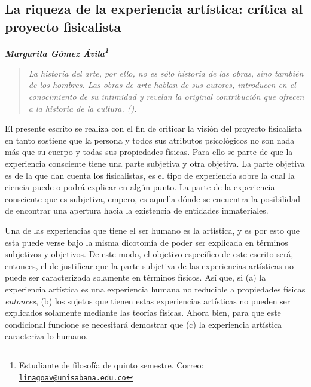\documentclass[]{book}
\newcommand{\autor}[1]{            %
  \begin{center}                   %
    \vspace*{-3.5em}               %
    \textbf{\textit{\large #1}}    %
    \vspace*{+4em}                 %
  \end{center}
}
\begin{document}
\begin{refsection}
\chapter{\texorpdfstring{\textbf{La riqueza de la experiencia artística:
crítica al proyecto
fisicalista}}{La riqueza de la experiencia artística: crítica al proyecto fisicalista}}\label{la-riqueza-de-la-experiencia-artuxedstica-cruxedtica-al-proyecto-fisicalista}

\autor{Margarita Gómez Ávila\footnote{Estudiante de filosofía de
  quinto semestre. Correo:
  \href{mailto:linagoav@unisabana.edu.co}{\nolinkurl{linagoav@unisabana.edu.co}}}}

\begin{quote}
\emph{La historia del arte, por ello, no es sólo historia de las obras,
sino también de los hombres. Las obras de arte hablan de sus autores,
introducen en el conocimiento de su intimidad y revelan la original
    contribución que ofrecen a la historia de la cultura. (\cite{Juan1999}).}
\end{quote}

El presente escrito se realiza con el fin de criticar la visión del
proyecto fisicalista en tanto sostiene que la persona y todos sus
atributos psicológicos no son nada más que su cuerpo y todas sus
propiedades físicas. Para ello se parte de que la experiencia consciente
tiene una parte subjetiva y otra objetiva. La parte objetiva es de la
que dan cuenta los fisicalistas, es el tipo de experiencia sobre la cual
la ciencia puede o podrá explicar en algún punto. La parte de la
experiencia consciente que es subjetiva, empero, es aquella dónde se
encuentra la posibilidad de encontrar una apertura hacia la existencia
de entidades inmateriales.

Una de las experiencias que tiene el ser humano es la artística, y es
por esto que esta puede verse bajo la misma dicotomía de poder ser
explicada en términos subjetivos y objetivos. De este modo, el objetivo
específico de este escrito será, entonces, el de justificar que la parte
subjetiva de las experiencias artísticas no puede ser caracterizada
solamente en términos físicos. Así que, si (a) la experiencia artística
es una experiencia humana no reducible a propiedades físicas
\emph{entonces}, (b) los sujetos que tienen estas experiencias
artísticas no pueden ser explicados solamente mediante las teorías
físicas. Ahora bien, para que este condicional funcione se necesitará
demostrar que (c) la experiencia artística caracteriza lo humano.


\end{refsection}
\end{document}
